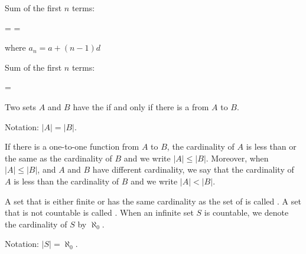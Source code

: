             \par Sum of the first $n$ terms:
            \begin{eqbox}
                 =  = 
            \end{eqbox}
            where $a_{n} = a + (n - 1)d$
            \par Sum of the first $n$ terms:
            \begin{eqbox}
                 = 
            \end{eqbox}
    \hiiEND

        \par Two sets $A$ and $B$ have the  if and only
        if there is a  from $A$ to $B$.
        \par Notation: $|A| = |B|$.
        \par If there is a one-to-one function from $A$ to $B$, the cardinality of $A$ is less
        than or the same as the cardinality of $B$ and we write $|A| \leq |B|$. Moreover, when
        $|A| \leq |B|$, and $A$ and $B$ have different cardinality, we say that the cardinality
        of $A$ is less than the cardinality of $B$ and we write $|A| < |B|$.
        \par A set that is either finite or has the same cardinality as the set of  is called . A set that is not countable is called
        . When an infinite set $S$ is countable, we denote the cardinality of
        $S$ by $\aleph_{0}$.
        \par Notation: $|S| = \aleph_{0}$.